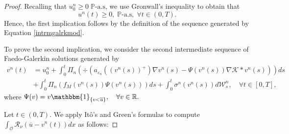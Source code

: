 \documentclass[10pt,number,preprint,times]{elsarticle}
\numberwithin{equation}{section} %
\begin{document}
\begin{proof}
\noindent
Recalling that $u^n_0 \geq 0\; \mathbb{P}\text{-a.s}$, we use 
Gronwall's inequality to obtain that 
$$u^n(t) \geq 0,\; \mathbb{P}\text{-a.s}, \; \forall t \in (0,T).$$
Hence, the first implication follows by the definition of the sequence generated by Equation \eqref{intrmgalrkmod}.


\noindent




\noindent
To prove the second implication, we consider the second intermediate sequence of Faedo-Galerkin solutions generated by
\begin{equation}\label{intrmgalrkmod2}
	\begin{split}
		v^n(t)&=u^n_0+\int_0^t \Pi_n\left( \div\left(a_{\varepsilon_n}(\left(v^n(s)\right)^+) \nabla v^n(s)-\Psi(v^n(s))\nabla \mathcal{K} \ast v^n(s)\right)\right)ds\\
		&+\int_0^t\Pi_n\left(f_M(v^n(s)) \Psi(v^n(s))\right)ds+\int_{0}^t \sigma^n(v^n(s))   d\mathcal{W}^n_s, \quad \forall t \in [0,T],
	\end{split}
\end{equation}
where 
$
\Psi(v)=v \mathbbm{1}_{\left\{v < \overline{u}\right\}}, \quad \forall  v \in \mathbb{R}.
$


\noindent
Let $t\in (0,T)$. We apply Itô's and Green's formulas to compute $\displaystyle \int_\mathcal{O} \mathcal{R}_{\nu}\left(\overline{u}-v^n(t)\right) dx$ as follows:


\end{proof}
\end{document}
